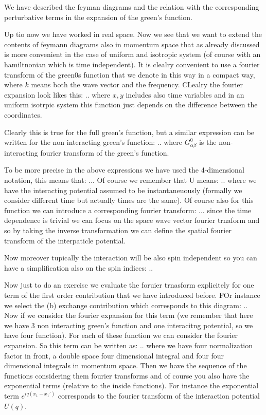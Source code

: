 \documentclass[../main/main.tex]{subfiles}
\begin{document}
We have described the feyman diagrams and the relation with the corresponding perturbative terms in the expansion of the green's function.

Up tio now we have worked in real space. Now we see that we want to extend the contents of feymann diagrams also in momentum space that as already discussed is more convenient in the case of uniform and isotropic system (of course with an hamiltnonian which is time independent).
It is clealry convenient to use a fourier transform of the green0s function that we denote in this way in a compact way, where \( k \) means both the wave vector and the frequency. CLealry the fourier expansion look likes this:
..
where \( x,y \) includes also time variables and in an uniform isotrpic system this function just depends on the difference between the coordinates.

Clearly this is true for the full green's function, but a similar expression can be written for the non interacting green's function:
..
where \( G^0_{\alpha \beta } \) is the non-interacting fourier transform of the green's function.

To be more precise in the above expressions we have used the 4-dimensional notation, this means that:
...
Of course we remember that U means:
..
where we have the interacting potential assumed to be instantaneuously (formally we consider different time but actually times are the same).
Of course also for this function we can introduce a corresponding fourier transform:
...
since the time dependence is trivial we can focus on the space wave vector fourier trnaform and so by taking the inverse transformation we can define the spatial fourier transform of the interpaticle potential.


Now moreover tupically the interaction will be also spin independent so you can have a simplification also on the spin indices:
..

Now just to do an exercise we evaluate the foruier trnasform explicitely for one term of the first order contribution that we have introduced before. FOr instance we select the (b) exchange contribution which corresponds to this diagram:
..
Now if we consider the fourier expansion for this term (we remember that here we have 3 non interacting green's function and one interacitng potential, so we have four function). For each of these function we can consider the fourier expansion. So this term can be written as:
..
where we have four normalization factor in front, a double space four dimensional integral and four four dimensional integrals in momentum space. Then we have the sequence of the functions considering them fourier transforms and of course you also have the exponential terms (relative to the inside functions). For instance the exponential term \( e^{iq(x_1-x_1')}  \) corresponds to the fourier transform of the interaction potential \( U(q) \).
\end{document}
